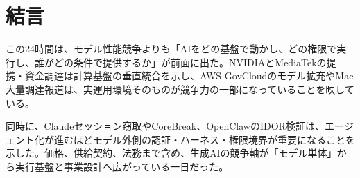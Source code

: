 \section{結言}
この24時間は、モデル性能競争よりも「AIをどの基盤で動かし、どの権限で実行し、誰がどの条件で提供するか」が前面に出た。NVIDIAとMediaTekの提携・資金調達は計算基盤の垂直統合を示し、AWS GovCloudのモデル拡充やMac大量調達報道は、実運用環境そのものが競争力の一部になっていることを映している。

同時に、Claudeセッション窃取やCoreBreak、OpenClawのIDOR検証は、エージェント化が進むほどモデル外側の認証・ハーネス・権限境界が重要になることを示した。価格、供給契約、法務まで含め、生成AIの競争軸が「モデル単体」から実行基盤と事業設計へ広がっている一日だった。
